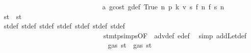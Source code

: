 \begin{isabellebody}
\ \ \ \ \ \ \ \ \ \ \ \ \ \ \ \ \ \ \ \ \ \ \ \ \ \ \ \ \isamarkupfalse%
\ a{}\ gcost\ g{\isacharunderscore}{\kern0pt}def\ True\ n{}\ p{}\ k{}\ v{}\ s{}\ f{}\ n{}\ f{}\ s{}\ n\ \isamarkupfalse%
\ {\isachardoublequoteopen}st{}{\isacharprime}{\kern0pt}\ {\isacharequal}{\kern0pt}\ st{\isacharprime}{\kern0pt}{\isacharprime}{\kern0pt}{\isacharprime}{\kern0pt}{\isacharprime}{\kern0pt}{\isacharprime}{\kern0pt}{\isacharprime}{\kern0pt}{\isacharprime}{\kern0pt}{\isacharprime}{\kern0pt}{\isachardoublequoteclose}\isanewline
\ \ \ \ \ \ \ \ \ \ \ \ \ \ \ \ \ \ \ \ \ \ \ \ \ \ \ \ \ \ \isamarkupfalse%
\ st{\isacharprime}{\kern0pt}{\isacharunderscore}{\kern0pt}def\ st{\isacharprime}{\kern0pt}{\isacharprime}{\kern0pt}{\isacharunderscore}{\kern0pt}def\ st{\isacharprime}{\kern0pt}{\isacharprime}{\kern0pt}{\isacharprime}{\kern0pt}{\isacharunderscore}{\kern0pt}def\ st{\isacharprime}{\kern0pt}{\isacharprime}{\kern0pt}{\isacharprime}{\kern0pt}{\isacharprime}{\kern0pt}{\isacharunderscore}{\kern0pt}def\ st{\isacharprime}{\kern0pt}{\isacharprime}{\kern0pt}{\isacharprime}{\kern0pt}{\isacharprime}{\kern0pt}{\isacharprime}{\kern0pt}{\isacharunderscore}{\kern0pt}def\ st{\isacharprime}{\kern0pt}{\isacharprime}{\kern0pt}{\isacharprime}{\kern0pt}{\isacharprime}{\kern0pt}{\isacharprime}{\kern0pt}{\isacharprime}{\kern0pt}{\isacharprime}{\kern0pt}{\isacharunderscore}{\kern0pt}def\ st{\isacharprime}{\kern0pt}{\isacharprime}{\kern0pt}{\isacharprime}{\kern0pt}{\isacharprime}{\kern0pt}{\isacharprime}{\kern0pt}{\isacharprime}{\kern0pt}{\isacharprime}{\kern0pt}{\isacharprime}{\kern0pt}{\isacharunderscore}{\kern0pt}def\isanewline
\ \ \ \ \ \ \ \ \ \ \ \ \ \ \ \ \ \ \ \ \ \ \ \ \ \ \ \ \ \ stmt{\isachardot}{\kern0pt}psimps{\isacharparenleft}{\kern0pt}{}{}{\isacharparenright}{\kern0pt}{\isacharbrackleft}{\kern0pt}OF\ {}{}{\isacharparenleft}{\kern0pt}{}{\isacharparenright}{\kern0pt}{\isacharbrackright}{\kern0pt}\ adv{\isacharunderscore}{\kern0pt}def\ e{\isacharprime}{\kern0pt}{\isacharunderscore}{\kern0pt}def\ \isamarkupfalse%
\ {\isacharparenleft}{\kern0pt}simp\ add{\isacharcolon}{\kern0pt}Let{\isacharunderscore}{\kern0pt}def{\isacharparenright}{\kern0pt}\isanewline
\ \ \ \ \ \ \ \ \ \ \ \ \ \ \ \ \ \ \ \ \ \ \ \ \ \ \ \ \isamarkupfalse%
\ \isamarkupfalse%
\ {\isachardoublequoteopen}gas\ st{}{\isacharprime}{\kern0pt}\ {\isacharequal}{\kern0pt}\ gas\ st{\isacharprime}{\kern0pt}{\isacharprime}{\kern0pt}{\isacharprime}{\kern0pt}{\isacharprime}{\kern0pt}{\isacharprime}{\kern0pt}{\isacharprime}{\kern0pt}{\isacharprime}{\kern0pt}{\isacharprime}{\kern0pt}{\isachardoublequoteclose}\ \isamarkupfalse%

\end{isabellebody}
